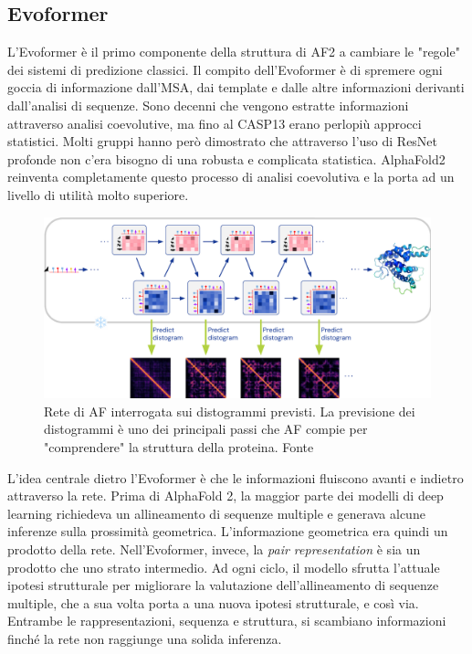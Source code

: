\subsection{Evoformer}
L'Evoformer è il primo componente della struttura di AF2 a cambiare le "regole" dei sistemi di predizione classici. Il compito dell'Evoformer è di spremere ogni goccia di informazione dall'MSA, dai template e dalle altre informazioni derivanti dall'analisi di sequenze. Sono decenni che vengono estratte informazioni attraverso analisi coevolutive, ma fino al CASP13 erano perlopiù approcci statistici. Molti gruppi hanno però dimostrato che attraverso l'uso di ResNet profonde non c'era bisogno di una robusta e complicata statistica. AlphaFold2 reinventa completamente questo processo di analisi coevolutiva e la porta ad un livello di utilità molto superiore.

\begin{figure}[!htb]
	\centering
	\includegraphics[scale=0.42]{images/evoformer2.png}
	\caption{Rete di AF interrogata sui distogrammi previsti. La previsione dei distogrammi è uno dei principali passi che AF compie per "comprendere" la struttura della proteina. Fonte\cite{AFslide}}
	\label{fig:evoformer-distogram}
\end{figure}

\par L'idea centrale dietro l'Evoformer è che le informazioni fluiscono avanti e indietro attraverso la rete. Prima di AlphaFold 2, la maggior parte dei modelli di deep learning richiedeva un allineamento di sequenze multiple e generava alcune inferenze sulla prossimità geometrica. L'informazione geometrica era quindi un prodotto della rete. Nell'Evoformer, invece, la \textit{pair representation} è sia un prodotto che uno strato intermedio. Ad ogni ciclo, il modello sfrutta l'attuale ipotesi strutturale per migliorare la valutazione dell'allineamento di sequenze multiple, che a sua volta porta a una nuova ipotesi strutturale, e così via. Entrambe le rappresentazioni, sequenza e struttura, si scambiano informazioni finché la rete non raggiunge una solida inferenza.

